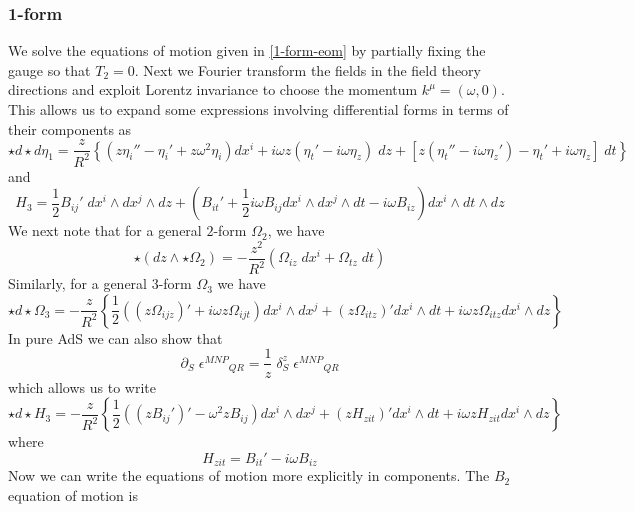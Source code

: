 \documentclass[aps,preprint,nofootinbib,preprintnumbers,eqsecnum,superscriptaddress]{revtex4}
\begin{document}
\subsubsection{1-form}
We solve the equations of motion given in \eqref{1-form-eom} by partially fixing the gauge so that $T_2 = 0$. Next we Fourier transform the fields in the field theory directions and exploit Lorentz invariance to choose the momentum $k^\mu = (\omega, 0)$. 
This allows us to expand some expressions involving differential forms in terms of their components as
\begin{equation}
	\star d \star d \eta_1
	= \frac{z}{R^2} \left\{
	\left(z\eta_i'' - \eta_i' + z \omega^2 \eta_i\right) dx^i + i \omega z (\eta_t' - i \omega \eta_z) \; dz + \left[z (\eta_t'' - i \omega \eta_z') - \eta_t' + i \omega \eta_z \right] \; dt
	\right\}
\end{equation}
and
\begin{equation}
	H_3
	= \frac{1}{2} B_{ij}' \; dx^i \wedge dx^j \wedge dz + \left(B_{it}' + \frac{1}{2} i \omega B_{ij} dx^i \wedge dx^j \wedge dt - i \omega B_{iz}\right) dx^i \wedge dt \wedge dz
\end{equation}
We next note that for a general $2$-form $\Omega_2$, we have
\begin{equation}
	\star(dz \wedge \star \Omega_2)
	= - \frac{z^2}{R^2}(\Omega_{iz} \; dx^i + \Omega_{tz} \; dt)
\end{equation}
Similarly, for a general $3$-form $\Omega_3$ we have
\begin{equation}
	\star d \star \Omega_3
	= - \frac{z}{R^2}\left\{\frac{1}{2}\left((z\Omega_{ijz})'+i \omega z \Omega_{ijt}\right)dx^i \wedge dx^j + (z\Omega_{itz})'dx^i \wedge dt + i \omega z \Omega_{itz} dx^i \wedge dz\right\}
\end{equation}
In pure AdS we can also show that
\begin{equation}
	\partial_S \; \epsilon^{MNP}{}_{QR} = \frac{1}{z} \; \delta_S^z \; \epsilon^{MNP}{}_{QR}
\end{equation}
which allows us to write
\begin{equation}
	\star d \star H_3
	= -\frac{z}{R^2} \left\{\frac{1}{2}((zB_{ij}')'-\omega^2 z B_{ij})dx^i \wedge dx^j + (zH_{zit})' dx^i \wedge dt + i \omega z H_{zit} dx^i \wedge dz \right\}
\end{equation}
where 
\begin{equation}
	H_{zit} = B_{it}' - i \omega B_{iz}
\end{equation}
Now we can write the equations of motion more explicitly in components. The $B_2$ equation of motion is 
\end{document}
